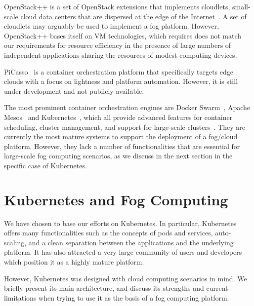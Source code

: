 \documentclass[letterpaper,twocolumn,10pt]{article}
\begin{document}

OpenStack++ is a set of OpenStack extensions that implements
cloudlets, small-scale cloud data centers that are dispersed at the
edge of the Internet~\cite{openstackplusplus}. A set of cloudlets may
arguably be used to implement a fog platform. However, OpenStack++
bases itself on VM technologies, which requires does not match our
requirements for resource efficiency in the presence of large numbers
of independent applications sharing the resources of modest computing
devices.

PiCasso~\cite{picasso} is a container orchestration platform that
specifically targets edge clouds with a focus on lightness and
platform automation. However, it is still under development and not
publicly available.

The most prominent container orchestration engines are Docker
Swarm~\cite{swarm}, Apache Mesos~\cite{mesos} and
Kubernetes~\cite{burns2016borg}, which all provide advanced features
for container scheduling, cluster management, and support for
large-scale clusters~\cite{kub-vs-swarm}. They are currently the most
mature systems to support the deployment of a fog/cloud
platform. However, they lack a number of functionalities that are
essential for large-scale fog computing scenarios, as we discuss in
the next section in the specific case of Kubernetes.

  
\section{Kubernetes and Fog Computing}\label{sec:kube}

We have chosen to base our efforts on Kubernetes.  In particular,
Kubernetes offers many functionalities such as the concepts of pods
and services, auto-scaling, and a clean separation between the
applications and the underlying platform. It has also attracted a very
large community of users and developers which position it as a highly
mature platform. 

However, Kubernetes was designed with cloud computing scenarios in
mind. We briefly present its main architecture, and discuss its
strengths and current limitations when trying to use it as the basis
of a fog computing platform.
\end{document}
